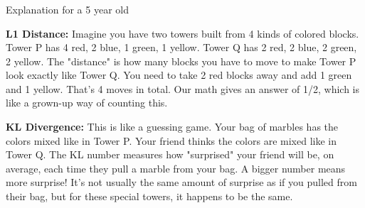 \documentclass{article}
\begin{document}
\subsubsection*{\normalfont}{Explanation for a 5 year old}\\
\parbox{\textwidth}{\textbf{L1 Distance:} Imagine you have two towers built from 4 kinds of colored blocks. Tower P has 4 red, 2 blue, 1 green, 1 yellow. Tower Q has 2 red, 2 blue, 2 green, 2 yellow. The "distance" is how many blocks you have to move to make Tower P look exactly like Tower Q. You need to take 2 red blocks away and add 1 green and 1 yellow. That's 4 moves in total. Our math gives an answer of 1/2, which is like a grown-up way of counting this.

\textbf{KL Divergence:} This is like a guessing game. Your bag of marbles has the colors mixed like in Tower P. Your friend thinks the colors are mixed like in Tower Q. The KL number measures how "surprised" your friend will be, on average, each time they pull a marble from your bag. A bigger number means more surprise! It's not usually the same amount of surprise as if you pulled from their bag, but for these special towers, it happens to be the same.}
\end{document}
